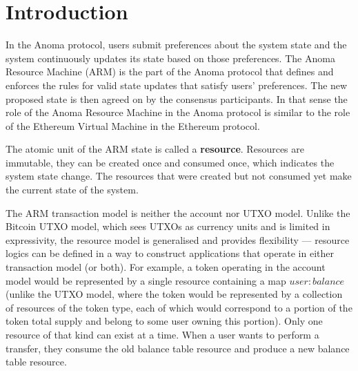 \documentclass[
    11pt,            %
    techreport,        %
    affiltop,       %
]{art}
\begin{document}
\maketitle


\tableofcontents

\section{Introduction}

In the Anoma protocol, users submit preferences about the system state and the system continuously updates its state based on those preferences. The Anoma Resource Machine (ARM) is the part of the Anoma protocol that defines and enforces the rules for valid state updates that satisfy users' preferences. The new proposed state is then agreed on by the consensus participants. In that sense the role of the Anoma Resource Machine in the Anoma protocol is similar to the role of the Ethereum Virtual Machine in the Ethereum protocol.

The atomic unit of the ARM state is called a \textbf{resource}. Resources are immutable, they can be created once and consumed once, which indicates the system state change. The resources that were created but not consumed yet make the current state of the system.

The ARM transaction model is neither the account nor UTXO model. Unlike the Bitcoin UTXO model, which sees UTXOs as currency units and is limited in expressivity, the resource model is generalised and provides flexibility — resource logics can be defined in a way to construct applications that operate in either transaction model (or both). 
For example, a token operating in the account model would be represented by a single resource containing a map $user: balance$ (unlike the UTXO model, where the token would be represented by a collection of resources of the token type, each of which would correspond to a portion of the token total supply and belong to some user owning this portion). Only one resource of that kind can exist at a time. When a user wants to perform a transfer, they consume the old balance table resource and produce a new balance table resource.
\end{document}
